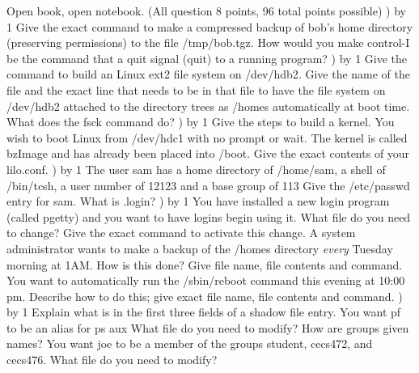 
\parindent=0in
\nopagenumbers
\newcount\quesno
{}
\def\ques{\number\quesno) \advance\quesno by 1}
\def\aspace{\vskip 1.5in}

Open book, open notebook. (All question 8 points, 96 total points possible)
\hfill\break
\ques
Give the exact command to make a compressed backup of {\ltt{}bob}'s home
directory (preserving permissions) to the file {\ltt{}/tmp/bob.tgz}.
\vskip 0.4in
How would you make control-I be the command that a quit signal ({\ltt{}quit})
to a running program?
\vskip 0.4in
\ques
Give the command to build an Linux ext2 file system on {\ltt{}/dev/hdb2}.
\vskip 0.5in
Give the name of the file and the exact line that needs to be in that file to
have the file system on {\ltt{}/dev/hdb2} attached to the directory trees
as {\ltt{}/homes} automatically at boot time.
\vskip 0.5in
What does the {\ltt{}fsck} command do?
\vskip 0.4in
\ques
Give the steps to build a kernel.
\vskip 2.0in
You wish to boot Linux from {\ltt{}/dev/hdc1} with no prompt or wait.
The kernel is called {\ltt{}bzImage} and has already been placed into
{\ltt{}/boot}.
Give the exact contents of your {\ltt{}lilo.conf}.
\vskip 1.8in
\vfill\eject
\ques
The user {\ltt{}sam} has  a home directory of {\ltt{}/home/sam},
a shell of {\ltt{}/bin/tcsh}, a user number of {\ltt{}12123}
and a base group of {\ltt{}113}
Give the {\ltt{}/etc/passwd} entry for {\ltt{}sam}.
\vskip 0.4in
What is {\ltt{}.login}?
\vskip 0.4in
\ques
You have installed a new login program (called {\ltt{}pgetty}) and you
want to have logins begin using it.
What file do you need to change? Give the exact command to activate this change.
\vskip 0.8in
A system administrator wants to make a backup of the {\ltt{}/homes} directory
{\it every} Tuesday morning at 1AM.
How is this done? Give file name, file contents and command.
\vskip 1.4in
You want to automatically run the {\ltt{}/sbin/reboot} command this evening
at 10:00 pm.
Describe how to do this; give exact file name, file contents and command.
\vskip 1.2in
\ques
Explain what is in the first three fields of a shadow file entry.
\vskip 1.5in
You want {\ltt{}pf} to be an alias for {\ltt{}ps aux}
What file do you need to modify?
\vskip 0.5in
How are groups given names?
You want joe to be a member of the groups {\ltt{}student}, {\ltt{}cecs472},
and {\ltt{}cecs476}.
What file do you need to modify?
\vskip 0.5in
\vfill\eject
